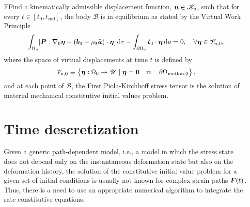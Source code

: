 \begin{problem}
    FFind a kinematically admissible displacement function, $\bm{u}\in \mathscr{K}_u$, such that for every $t\in [t_0,t_\text{end}]$, the body $\mathscr{B}$ is in equilibrium as stated by the Virtual Work Principle
        \begin{equation}
        \int_{\Omega_0} [\bm{P}:\nabla_0 \bm{\eta} - (\bm{b}_0-\rho_0\ddot{\bm u})\cdot \bm{\eta}]\,\mathrm{d} v - \int_{\partial\Omega_0} \bm{t}_0\cdot \bm{\eta}\,\mathrm{d} a = 0,\quad \forall \bm{\eta} \in \mathscr{V}_{u,0},
    \end{equation}
    where the space of virtual displacements at time $t$ is defined by
    \begin{equation}
        \mathscr{V}_{u,0} \equiv \left\{\bm{\eta}:\Omega_0\to \mathscr{U}\;|\;\bm{\eta} = \bm{0}\quad \text{in}\quad \partial\Omega_\text{motion,0}\right\},
    \end{equation}
    and at each point of $\mathscr{B}$, the First Piola-Kirchhoff stress tensor is the solution of material mechanical constitutive initial values problem.
\end{problem}

\section{Time descretization} \label{sec:time_discretization}

Given a generic path-dependent model, i.e., a model in which the stress state does not depend only on the instantaneous deformation state but also on the deformation history, the solution of the constitutive initial value problem for a given set of initial conditions is usually not known for complex strain paths $\bm{F}(t)$.
Thus, there is a need to use an appropriate numerical algorithm to integrate the rate constitutive equations.

